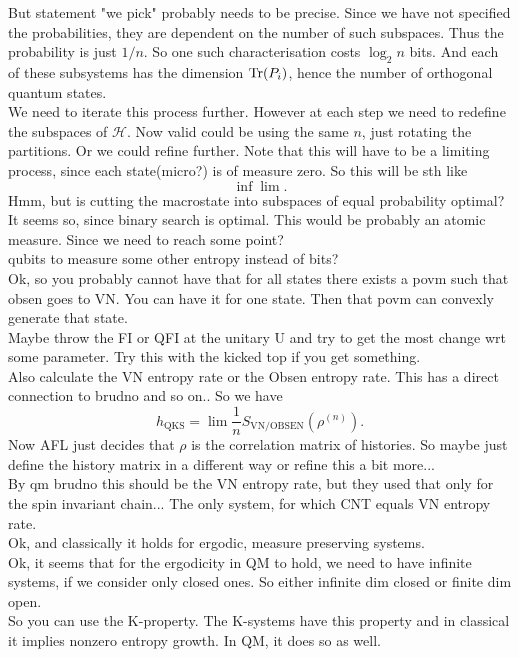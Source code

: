 \documentclass{article}
\begin{document}
But statement "we pick" probably needs to be precise. Since we have not specified the probabilities, they are dependent on the number of such subspaces. Thus the probability is just $1/n$. So one such characterisation costs $\log_2n$ bits. And each of these subsystems has the dimension $\text{Tr}(P_i)$, hence the number of orthogonal quantum states. \\ 


We need to iterate this process further. However at each step we need to redefine the subspaces of $\mathcal{H}$. Now valid could be using the same $n$, just rotating the partitions. Or we could refine further. Note that this will have to be a limiting process, since each state(micro?) is of measure zero. So this will be sth like
\[
    \inf \lim .
\]
Hmm, but is cutting the macrostate into subspaces of equal probability optimal? It seems so, since binary search is optimal. This would be probably an atomic measure. Since we need to reach some point? \\
qubits to measure some other entropy instead of bits?\\
Ok, so you probably cannot have that for all states there exists a povm such that obsen goes to VN. You can have it for one state. Then that povm can convexly generate that state. \\
Maybe throw the FI or QFI at the unitary U and try to get the most change wrt some parameter. Try this with the kicked top if you get something. \\
Also calculate the VN entropy rate or the Obsen entropy rate. This has a direct connection to brudno and so on.. So we have
\[
    h_{\text{QKS}} = \lim \frac{1}{n}S_{\text{VN/OBSEN}}(\rho^{(n)}).
\]
Now AFL just decides that $\rho$ is the correlation matrix of histories. So maybe just define the history matrix in a different way or refine this a bit more...\\
By qm brudno this should be the VN entropy rate, but they used that only for the spin invariant chain... The only system, for which CNT equals VN entropy rate. \\
Ok, and classically it holds for ergodic, measure preserving systems. \\
Ok, it seems that for the ergodicity in QM to hold, we need to have infinite systems, if we consider only closed ones. So either infinite dim closed or finite dim open. \\
So you can use the K-property. The K-systems have this property and in classical it implies nonzero entropy growth. In QM, it does so as well. 
\end{document}
